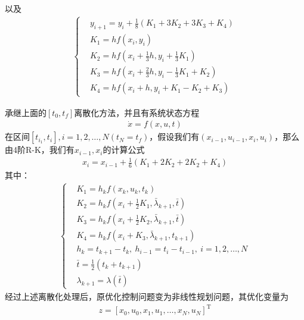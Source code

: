             以及
            \begin{align*}
            \left\{
            \begin{aligned}
            & y_{i+1} = y_i + \frac{1}{8}(K_1+3K_2+3K_3+K_4)\\
            & K_1 = hf(x_i,y_i)\\
            & K_2 = hf(x_i+\frac{1}{3}h,y_i+\frac{1}{3}K_1)\\
            & K_3 = hf(x_i+\frac{2}{3}h,y_i-\frac{1}{3}K_1+K_2)\\
            & K_4 = hf(x_i+h,y_i+K_1-K_2+K_3)
            \end{aligned}
            \right.
            \end{align*}
            \par
            承继上面的$[t_0,t_f]$离散化方法，并且有系统状态方程
            \begin{align*}
            \dot{x} = f(x,u,t)
            \end{align*}
            在区间$[t_{i_1},t_i],i=1,2,\dots,N(t_N = t_f)$，假设我们有$(x_{i-1},u_{i-1},x_i,u_i)$，那么由4阶R-K，我们有$x_{i-1},x_i$的计算公式
            \begin{align*}
            x_i = x_{i-1}+\frac{1}{6}(K_1+2K_2+2K_2+K_4)
            \end{align*}
            其中：
            \begin{align*}
            \left\{
            \begin{aligned}
            & K_1 = h_kf(x_k,u_k,t_k)\\
            & K_2 = h_kf(x_i+\frac{1}{2}K_1,\bar{\lambda}_{k+1},\bar{t})\\
            & K_3 = h_kf(x_i+\frac{1}{2}K_2,\bar{\lambda}_{k+1},\bar{t})\\
            & K_4 = h_kf(x_i+K_3,\bar{\lambda}_{k+1},t_{k+1})\\
            & h_k = t_{k+1}-t_k,\ h_{i-1} = t_i - t_{i-1},\ i=1,2,\dots,N\\
            & \bar{t} = \frac{1}{2}(t_k+t_{k+1})\\
            & \lambda_{k+1} = \lambda(\bar{t})
            \end{aligned}
            \right.
            \end{align*}
            经过上述离散化处理后，原优化控制问题变为非线性规划问题，其优化变量为
            \begin{align*}
            z = [x_0,u_0,x_1,u_1,\dots,x_N,u_N]^\mathrm{T}
            \end{align*}
